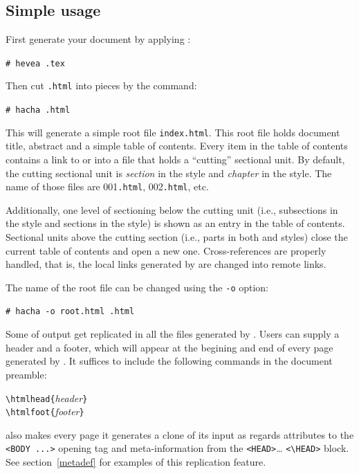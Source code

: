 \subsection{Simple usage}
First generate your {\html} document by applying \hevea{}:
\begin{flushleft}
\texttt{\# hevea }\texttt{.tex}
\end{flushleft}
Then cut \texttt{.html} into pieces by the command:
\begin{flushleft}
\texttt{\# hacha }\texttt{.html}
\end{flushleft}
This will generate a simple root file
\texttt{index.html}.
This root file holds document title, abstract and a simple table of
contents.
Every item in the table of contents contains a link to or into a file
that holds a ``cutting'' sectional unit.
By default, the cutting sectional unit is {\em section} in the
 style and {\em chapter} in the 
style.
The name of those files are 001\texttt{.html},
002\texttt{.html}, etc.

Additionally, one level of sectioning below the cutting unit (i.e.,
subsections in the  style and sections in the
 style) is shown
as an entry in the table of contents.
Sectional units above the cutting section (i.e., parts in both
 and  styles) close the current table
of contents and open a new one.
Cross-references are properly handled, that is, the local links generated by
\hevea{} are changed into remote links.

The name of the root  file can be changed using the
\verb+-o+ option:
\begin{flushleft}
\texttt{\# hacha -o root.html }\texttt{.html}
\end{flushleft}


Some of \hevea{} output get replicated in all the files generated by
\hacha{}.
Users can supply a header and a footer, which  will appear at the
begining and end of every page generated by \hacha{}. It suffices to
include the following commands in the document preamble:
\begin{flushleft}
\quad\verb+\htmlhead{+\textit{header}\verb+}+\\
\quad\verb+\htmlfoot{+\textit{footer}\verb+}+
\end{flushleft}

\hacha{} also makes every page it generates a clone of its input as
regards attributes to the \verb+<BODY ...>+ opening tag and
meta-information from the \verb+<HEAD>+\ldots{} \verb+<\HEAD>+
block. See section~\ref{metadef} for examples of this replication
feature.

